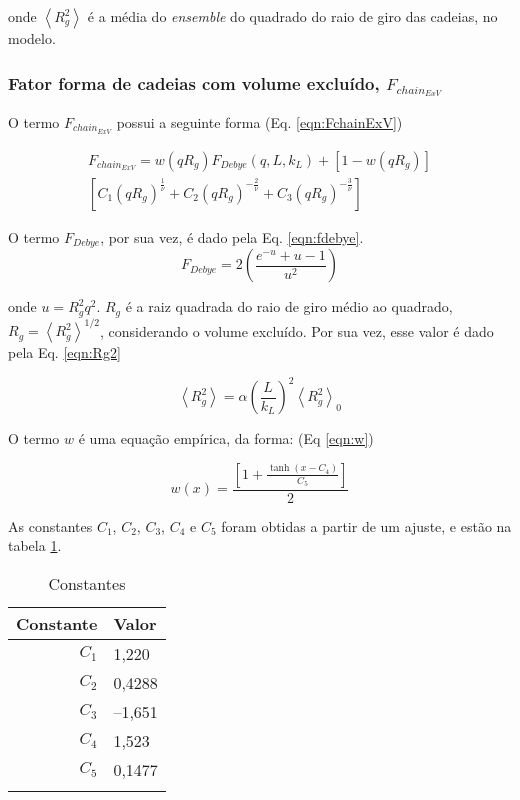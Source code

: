 \begin{apendicesenv}
	\noindent onde $\left<R_g^2\right>$ é a média do \emph{ensemble} do quadrado do raio de giro das cadeias, no modelo.
	
	\subsubsection{Fator forma de cadeias com volume excluído, $F_{chain_{ExV}}$}
	
	O termo $F_{chain_{ExV}}$ possui a seguinte forma (Eq. \ref{eqn:FchainExV})
	
	\begin{multline}
	F_{chain_{ExV}} = w(qR_g)F_{Debye}(q,L,k_L) + \left[1 - w(q R_g)\right] \\ \left[C_1(q R_g)^{\frac{1}{\nu}} + C_2(q R_g)^{-\frac{2}{\nu}} + 
	C_3(q R_g)^{-\frac{3}{\nu}}\right]
	\label{eqn:FchainExV}
	\end{multline}
	
	
	O termo $F_{Debye}$, por sua vez, é dado pela Eq. \ref{eqn:fdebye}.
	\begin{equation}
	F_{Debye} = 2 \left(\frac{e^{-u} + u - 1}{u^2}\right)
	\label{eqn:fdebye}
	\end{equation}
	
	\noindent onde $u = R_g^2q^2$. $R_g$ é a raiz quadrada do raio de giro médio ao quadrado, $R_g = \left<R_g^2\right>^{1/2}$, considerando o volume excluído. Por sua vez, esse valor é dado pela Eq. \ref{eqn:Rg2}
	
	\begin{equation}
	\left<R_g^2\right> = \alpha \left(\frac{L}{k_L}\right)^2\left<R_g^2\right>_0
	\label{eqn:Rg2}
	\end{equation}
	
	O termo $w$ é uma equação empírica, da forma: (Eq \ref{eqn:w})
	
	\begin{equation}
	w(x) = \frac{\left[1 + \frac{\tanh(x-C_4)}{C_5}\right]}{2}
	\label{eqn:w}
	\end{equation}
	
	As constantes $C_1$, $C_2$, $C_3$, $C_4$ e $C_5$ foram obtidas a partir de um ajuste, e estão na tabela \ref{tab_ap:C1C5}.
	
	\begin{longtable}[c]{r l}
		\toprule
		Constante 			& Valor \\
		\midrule
		$C_1$			&  1,220	\\
		$C_2$			&  0,4288	\\
		$C_3$			&  --1,651	\\
		$C_4$			&  1,523	\\
		$C_5$			&  0,1477 	\\						
		\bottomrule
		\caption{Constantes}
		\label{tab_ap:C1C5} 
	\end{longtable}
	

\end{apendicesenv}
